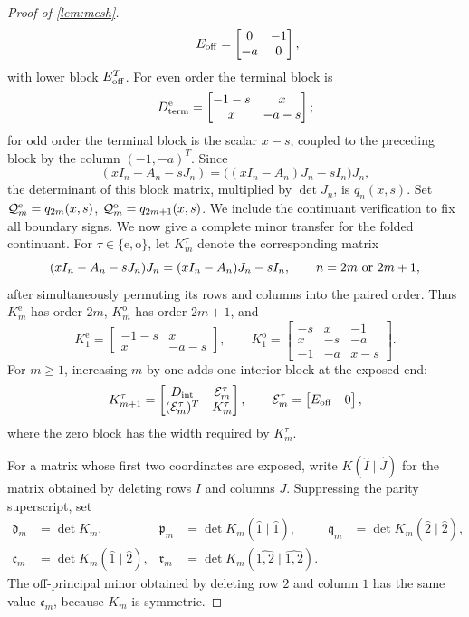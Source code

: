 \documentclass[review,hidelinks,onefignum,onetabnum]{siamart251216}
\begin{document}
\begin{proof}[Proof of \cref{lem:mesh}]
\[ \qquad
 E_{\rm off}=\begin{bmatrix}0&-1\\-a&0\end{bmatrix},
\]
with lower block \(E_{\rm off}^T\).  For even order the terminal block is
\[
 D_{\rm term}^{\rm e}=\begin{bmatrix}-1-s&x\\x&-a-s\end{bmatrix};
\]
for odd order the terminal block is the scalar \(x-s\), coupled to the
preceding block by the column \((-1,-a)^T\).  Since
\[
 (xI_n-A_n-sJ_n)=\bigl((xI_n-A_n)J_n-sI_n\bigr)J_n,
\]
the determinant of this block matrix, multiplied by \(\det J_n\), is
\(q_n(x,s)\).  Set \(\mathcal Q_m^{\rm e}=q_{2m}(x,s)\),
\(\mathcal Q_m^{\rm o}=q_{2m+1}(x,s)\).  We include the continuant
verification to fix all boundary signs.
We now give a complete minor transfer for the folded continuant.
For \(\tau\in\{\mathrm e,\mathrm o\}\), let \(K_m^\tau\) denote the
corresponding matrix
\[
 (xI_n-A_n-sJ_n)J_n=(xI_n-A_n)J_n-sI_n,
 \qquad n=2m\ \hbox{or}\ 2m+1,
\]
after simultaneously permuting its rows and columns into the paired
order.  Thus \(K_m^{\mathrm e}\) has order \(2m\),
\(K_m^{\mathrm o}\) has order \(2m+1\), and
\[
 K_1^{\mathrm e}=
 \begin{bmatrix}-1-s&x\\x&-a-s\end{bmatrix},
 \qquad
 K_1^{\mathrm o}=
 \begin{bmatrix}
 -s&x&-1\\
 x&-s&-a\\
 -1&-a&x-s
 \end{bmatrix}.
\]
For \(m\geq1\), increasing \(m\) by one adds one interior block at the
exposed end:
\begin{equation}\label{eq:fold-block-extension}
 K_{m+1}^\tau=
 \begin{bmatrix}
  D_{\rm int}&\mathcal E_m^\tau\\
  (\mathcal E_m^\tau)^T&K_m^\tau
 \end{bmatrix},
 \qquad
 \mathcal E_m^\tau=
 \begin{bmatrix}E_{\rm off}&0\end{bmatrix},
\end{equation}
where the zero block has the width required by \(K_m^\tau\).

For a matrix whose first two coordinates are exposed, write
\(K(\widehat I\mid\widehat J)\) for the matrix obtained by deleting
rows \(I\) and columns \(J\).  Suppressing the parity superscript, set
\[
\begin{aligned}
 \mathfrak d_m&=\det K_m,&
 \mathfrak p_m&=\det K_m(\widehat1\mid\widehat1),&
 \mathfrak q_m&=\det K_m(\widehat2\mid\widehat2),\\
 \mathfrak c_m&=\det K_m(\widehat1\mid\widehat2),&
 \mathfrak r_m&=\det K_m(\widehat{1,2}\mid\widehat{1,2}).
\end{aligned}
\]
The off-principal minor obtained by deleting row \(2\) and column \(1\)
has the same value \(\mathfrak c_m\), because \(K_m\) is symmetric.


\end{proof}
\end{document}
